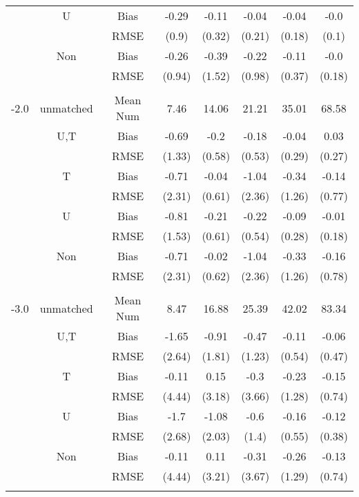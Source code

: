 \begin{tabular}{@{\extracolsep{5pt}}lc|cccccc}
 & U & Bias & -0.29 & -0.11 & -0.04 & -0.04 & -0.0 \\
 &  & RMSE & (0.9) & (0.32) & (0.21) & (0.18) & (0.1) \\
 & Non & Bias & -0.26 & -0.39 & -0.22 & -0.11 & -0.0 \\
 &  & RMSE & (0.94) & (1.52) & (0.98) & (0.37) & (0.18) \\
 &  &  &  &  &  &  &  \\
-2.0 & unmatched & Mean Num & 7.46 & 14.06 & 21.21 & 35.01 & 68.58 \\
 & U,T & Bias & -0.69 & -0.2 & -0.18 & -0.04 & 0.03 \\
 &  & RMSE & (1.33) & (0.58) & (0.53) & (0.29) & (0.27) \\
 & T & Bias & -0.71 & -0.04 & -1.04 & -0.34 & -0.14 \\
 &  & RMSE & (2.31) & (0.61) & (2.36) & (1.26) & (0.77) \\
 & U & Bias & -0.81 & -0.21 & -0.22 & -0.09 & -0.01 \\
 &  & RMSE & (1.53) & (0.61) & (0.54) & (0.28) & (0.18) \\
 & Non & Bias & -0.71 & -0.02 & -1.04 & -0.33 & -0.16 \\
 &  & RMSE & (2.31) & (0.62) & (2.36) & (1.26) & (0.78) \\
 &  &  &  &  &  &  &  \\
-3.0 & unmatched & Mean Num & 8.47 & 16.88 & 25.39 & 42.02 & 83.34 \\
 & U,T & Bias & -1.65 & -0.91 & -0.47 & -0.11 & -0.06 \\
 &  & RMSE & (2.64) & (1.81) & (1.23) & (0.54) & (0.47) \\
 & T & Bias & -0.11 & 0.15 & -0.3 & -0.23 & -0.15 \\
 &  & RMSE & (4.44) & (3.18) & (3.66) & (1.28) & (0.74) \\
 & U & Bias & -1.7 & -1.08 & -0.6 & -0.16 & -0.12 \\
 &  & RMSE & (2.68) & (2.03) & (1.4) & (0.55) & (0.38) \\
 & Non & Bias & -0.11 & 0.11 & -0.31 & -0.26 & -0.13 \\
 &  & RMSE & (4.44) & (3.21) & (3.67) & (1.29) & (0.74) \\
 &  &  &  &  &  &  &  \\
\hline 
\bottomrule 
\end{tabular}
